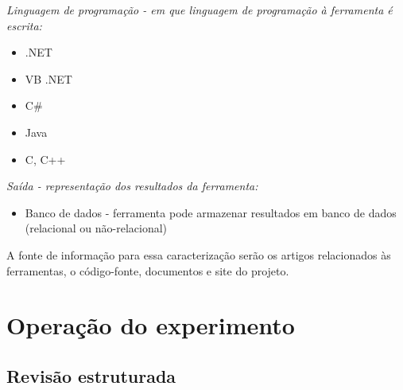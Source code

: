 \begin{description}

  \item {\it Linguagem de programação - em que linguagem de programação à ferramenta é escrita:}
    \begin{itemize}
      \item .NET
      \item VB .NET
      \item C\#
      \item Java
      \item C, C++
    \end{itemize}

%
%

  \item {\it Saída - representação dos resultados da ferramenta:}
    \begin{itemize}
      \item Banco de dados - ferramenta pode armazenar resultados em banco de dados (relacional ou não-relacional)
    \end{itemize}

\end{description}

A fonte de informação para essa caracterização serão os artigos relacionados às
ferramentas, o código-fonte, documentos e site do projeto.



\section{Operação do experimento}

\subsection{Revisão estruturada}

